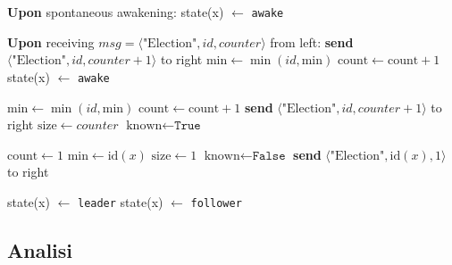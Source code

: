 \begin{algorithm}
\caption{All The Way}
\begin{algorithmic}[1]
    \Statex \textbf{Upon} spontaneous awakening:
        \State {}
        \State state(x) $\gets$ \texttt{awake}
    \EndIf

    \Statex
    \Statex \textbf{Upon} receiving $msg = \langle \text{"Election"}, id, counter \rangle$ from left:
        \State {}
        \State \textbf{send} $\langle \text{"Election"}, id, counter + 1 \rangle$ to right
        \State $\text{min} \gets \min(id, \text{min})$
        \State $\text{count} \gets \text{count} + 1$
        \State state(x) $\gets$ \texttt{awake}
    \EndIf
    
    \Statex
            \State $\text{min} \gets \min(id, \text{min})$
            \State $\text{count} \gets \text{count} + 1$
            \State \textbf{send} $\langle \text{"Election"}, id, counter + 1 \rangle$ to right
                \State {}
            \EndIf
        \Else
            \State $\text{size} \gets counter$
            \State $\text{known} \gets \texttt{True}$
            \State {}
        \EndIf
    \EndIf

    \Statex
        \State $\text{count} \gets 1$
        \State $\text{min} \gets \text{id}(x)$
        \State $\text{size} \gets 1$
        \State $\text{known} \gets \texttt{False}$
        \State \textbf{send} $\langle \text{"Election"}, \text{id}(x), 1 \rangle$ to right
    \EndProcedure

    \Statex
                \State state(x) $\gets$ \texttt{leader}
            \Else
                \State state(x) $\gets$ \texttt{follower}
            \EndIf
        \EndIf
    \EndProcedure
\end{algorithmic}
\end{algorithm}

\subsection{Analisi}

